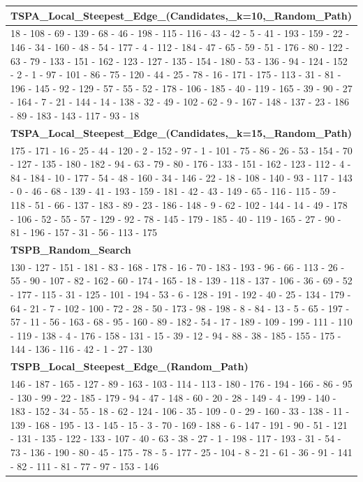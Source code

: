 \begin{table}[h!]
\begin{tabular}{|p{14cm}|}
\textbf{TSPA\_Local\_Steepest\_Edge\_(Candidates,\_k=10,\_Random\_Path)} \\ \hline
18 - 108 - 69 - 139 - 68 - 46 - 198 - 115 - 116 - 43 - 42 - 5 - 41 - 193 - 159 - 22 - 146 - 34 - 160 - 48 - 54 - 177 - 4 - 112 - 184 - 47 - 65 - 59 - 51 - 176 - 80 - 122 - 63 - 79 - 133 - 151 - 162 - 123 - 127 - 135 - 154 - 180 - 53 - 136 - 94 - 124 - 152 - 2 - 1 - 97 - 101 - 86 - 75 - 120 - 44 - 25 - 78 - 16 - 171 - 175 - 113 - 31 - 81 - 196 - 145 - 92 - 129 - 57 - 55 - 52 - 178 - 106 - 185 - 40 - 119 - 165 - 39 - 90 - 27 - 164 - 7 - 21 - 144 - 14 - 138 - 32 - 49 - 102 - 62 - 9 - 167 - 148 - 137 - 23 - 186 - 89 - 183 - 143 - 117 - 93 - 18 \\ \hline
\textbf{TSPA\_Local\_Steepest\_Edge\_(Candidates,\_k=15,\_Random\_Path)} \\ \hline
175 - 171 - 16 - 25 - 44 - 120 - 2 - 152 - 97 - 1 - 101 - 75 - 86 - 26 - 53 - 154 - 70 - 127 - 135 - 180 - 182 - 94 - 63 - 79 - 80 - 176 - 133 - 151 - 162 - 123 - 112 - 4 - 84 - 184 - 10 - 177 - 54 - 48 - 160 - 34 - 146 - 22 - 18 - 108 - 140 - 93 - 117 - 143 - 0 - 46 - 68 - 139 - 41 - 193 - 159 - 181 - 42 - 43 - 149 - 65 - 116 - 115 - 59 - 118 - 51 - 66 - 137 - 183 - 89 - 23 - 186 - 148 - 9 - 62 - 102 - 144 - 14 - 49 - 178 - 106 - 52 - 55 - 57 - 129 - 92 - 78 - 145 - 179 - 185 - 40 - 119 - 165 - 27 - 90 - 81 - 196 - 157 - 31 - 56 - 113 - 175 \\ \hline
\textbf{TSPB\_Random\_Search} \\ \hline
130 - 127 - 151 - 181 - 83 - 168 - 178 - 16 - 70 - 183 - 193 - 96 - 66 - 113 - 26 - 55 - 90 - 107 - 82 - 162 - 60 - 174 - 165 - 18 - 139 - 118 - 137 - 106 - 36 - 69 - 52 - 177 - 115 - 31 - 125 - 101 - 194 - 53 - 6 - 128 - 191 - 192 - 40 - 25 - 134 - 179 - 64 - 21 - 7 - 102 - 100 - 72 - 28 - 50 - 173 - 98 - 198 - 8 - 84 - 13 - 5 - 65 - 197 - 57 - 11 - 56 - 163 - 68 - 95 - 160 - 89 - 182 - 54 - 17 - 189 - 109 - 199 - 111 - 110 - 119 - 138 - 4 - 176 - 158 - 131 - 15 - 39 - 12 - 94 - 88 - 38 - 185 - 155 - 175 - 144 - 136 - 116 - 42 - 1 - 27 - 130 \\ \hline
\textbf{TSPB\_Local\_Steepest\_Edge\_(Random\_Path)} \\ \hline
146 - 187 - 165 - 127 - 89 - 163 - 103 - 114 - 113 - 180 - 176 - 194 - 166 - 86 - 95 - 130 - 99 - 22 - 185 - 179 - 94 - 47 - 148 - 60 - 20 - 28 - 149 - 4 - 199 - 140 - 183 - 152 - 34 - 55 - 18 - 62 - 124 - 106 - 35 - 109 - 0 - 29 - 160 - 33 - 138 - 11 - 139 - 168 - 195 - 13 - 145 - 15 - 3 - 70 - 169 - 188 - 6 - 147 - 191 - 90 - 51 - 121 - 131 - 135 - 122 - 133 - 107 - 40 - 63 - 38 - 27 - 1 - 198 - 117 - 193 - 31 - 54 - 73 - 136 - 190 - 80 - 45 - 175 - 78 - 5 - 177 - 25 - 104 - 8 - 21 - 61 - 36 - 91 - 141 - 82 - 111 - 81 - 77 - 97 - 153 - 146 \\ \hline

\end{tabular}
\end{table}
